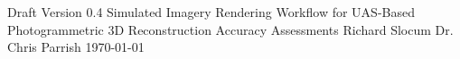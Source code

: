 \documentclass{article}
\begin{document}
\insertOSUTitleTwo
{Draft}
{Version 0.4}
{Simulated Imagery Rendering Workflow for UAS-Based Photogrammetric 3D Reconstruction Accuracy Assessments}
{Richard}
{Slocum}
{Dr. Chris}
{Parrish}
{\today}
	

\cleardoublepage











\cleardoublepage

	
\end{document}

